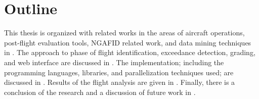 \section{Outline} \label{sec:outline}

	This thesis is organized with related works in the areas of aircraft operations, post-flight evaluation tools, NGAFID related work, and data mining techniques in .  The approach to phase of flight identification, exceedance detection, grading, and web interface are discussed in .  The implementation; including the programming languages, libraries, and parallelization techniques used; are discussed in .  Results of the flight analysis are given in .  Finally, there is a conclusion of the research and a discussion of future work in .
    
    
    
